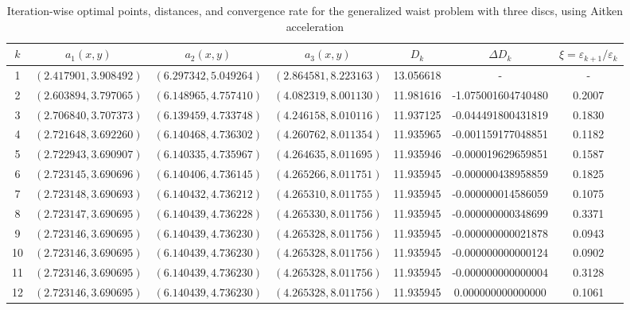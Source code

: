 \documentclass[12pt]{article}
\renewcommand{\arraystretch}{1.2} %
\theoremstyle{plain}
\theoremstyle{definition}
\begin{document}
\begin{table}[H]
	\centering
	\begin{sideways}
		\renewcommand{\arraystretch}{1.5}
		\begin{tabular}{|c|c|c|c|c|c|c|}
			\hline
			$k$ & $a_1 (x,y)$ & $a_2 (x,y)$ & $a_3 (x,y)$ & $D_k$ & $\Delta D_k$  & $\xi=\varepsilon_{k+1}/\varepsilon_{k}$ \\ 
			\hline
			1 & $(2.417901, 3.908492)$ & $(6.297342, 5.049264)$ & $(2.864581, 8.223163)$ & 13.056618 & - &- \\ 
			2 & $(2.603894, 3.797065)$ & $(6.148965, 4.757410)$ & $(4.082319, 8.001130)$ & 11.981616 & -1.075001604740480 & 0.2007 \\  
			3 & $(2.706840, 3.707373)$ & $(6.139459, 4.733748)$ & $(4.246158, 8.010116)$ & 11.937125 & -0.044491800431819 & 0.1830 \\  
			4 & $(2.721648, 3.692260)$ & $(6.140468, 4.736302)$ & $(4.260762, 8.011354)$ & 11.935965 & -0.001159177048851 & 0.1182 \\  
			5 & $(2.722943, 3.690907)$ & $(6.140335, 4.735967)$ & $(4.264635, 8.011695)$ & 11.935946 & -0.000019629659851 & 0.1587 \\  
			6 & $(2.723145, 3.690696)$ & $(6.140406, 4.736145)$ & $(4.265266, 8.011751)$ & 11.935945 & -0.000000438958859 & 0.1825 \\  
			7 & $(2.723148, 3.690693)$ & $(6.140432, 4.736212)$ & $(4.265310, 8.011755)$ & 11.935945 & -0.000000014586059 & 0.1075 \\  
			8 & $(2.723147, 3.690695)$ & $(6.140439, 4.736228)$ & $(4.265330, 8.011756)$ & 11.935945 & -0.000000000348699 & 0.3371 \\  
			9 & $(2.723146, 3.690695)$ & $(6.140439, 4.736230)$ & $(4.265328, 8.011756)$ & 11.935945 & -0.000000000021878 & 0.0943 \\  
			10 & $(2.723146, 3.690695)$ & $(6.140439, 4.736230)$ & $(4.265328, 8.011756)$ & 11.935945 & -0.000000000000124 & 0.0902 \\  
			11 & $(2.723146, 3.690695)$ & $(6.140439, 4.736230)$ & $(4.265328, 8.011756)$ & 11.935945 & -0.000000000000004 & 0.3128 \\  
			12 & $(2.723146, 3.690695)$ & $(6.140439, 4.736230)$ & $(4.265328, 8.011756)$ & 11.935945 & 0.000000000000000 & 0.1061 \\ \hline
		\end{tabular}
		
	\end{sideways}
	\caption{Iteration-wise optimal points, distances, and convergence rate for the generalized waist problem with three discs, using Aitken acceleration}
	\label{tab:example1_aitken_data}
\end{table}
\end{document}

